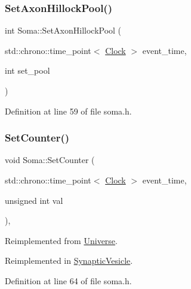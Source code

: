 \subsubsection{\texorpdfstring{Set\+Axon\+Hillock\+Pool()}{SetAxonHillockPool()}}
{\footnotesize\ttfamily int Soma\+::\+Set\+Axon\+Hillock\+Pool (\begin{DoxyParamCaption}\item[{std\+::chrono\+::time\+\_\+point$<$ \hyperlink{universe_8h_a0ef8d951d1ca5ab3cfaf7ab4c7a6fd80}{Clock} $>$}]{event\+\_\+time,  }\item[{int}]{set\+\_\+pool }\end{DoxyParamCaption})\hspace{0.3cm}{\ttfamily [inline]}}



Definition at line 59 of file soma.\+h.

\mbox{\label{class_soma_a9ef49d3fea8c0fbe6513f3910339f736}} 
\subsubsection{\texorpdfstring{Set\+Counter()}{SetCounter()}}
{\footnotesize\ttfamily void Soma\+::\+Set\+Counter (\begin{DoxyParamCaption}\item[{std\+::chrono\+::time\+\_\+point$<$ \hyperlink{universe_8h_a0ef8d951d1ca5ab3cfaf7ab4c7a6fd80}{Clock} $>$}]{event\+\_\+time,  }\item[{unsigned int}]{val }\end{DoxyParamCaption})\hspace{0.3cm}{\ttfamily [inline]}, {\ttfamily [virtual]}}



Reimplemented from \hyperlink{class_universe_aa22202ae740eb1355529afcb13285e91}{Universe}.



Reimplemented in \hyperlink{class_synaptic_vesicle_a7fd7cfce5eccb904206d968866f85220}{Synaptic\+Vesicle}.



Definition at line 64 of file soma.\+h.

\mbox{\label{class_soma_ac9fb87be6f9453cc4313e3a35c8b950c}} 
